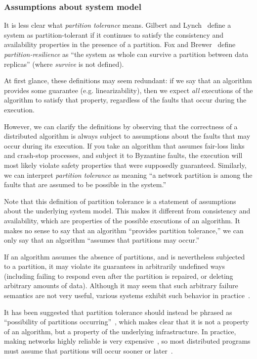 \documentclass[a4paper,twocolumn,10pt]{article}
\begin{document}
\subsubsection{Assumptions about system model}

It is less clear what \emph{partition tolerance} means. Gilbert and Lynch~\cite{Gilbert2002il}
define a system as partition-tolerant if it continues to satisfy the consistency and availability
properties in the presence of a partition. Fox and Brewer~\cite{Fox1999bs} define
\emph{partition-resilience} as ``the system as whole can survive a partition between data replicas''
(where \emph{survive} is not defined).

At first glance, these definitions may seem redundant: if we say that an algorithm provides some
guarantee (e.g. linearizability), then we expect \emph{all} executions of the algorithm to satisfy
that property, regardless of the faults that occur during the execution.

However, we can clarify the definitions by observing that the correctness of a distributed algorithm
is always subject to assumptions about the faults that may occur during its execution. If you take
an algorithm that assumes fair-loss links and crash-stop processes, and subject it to Byzantine
faults, the execution will most likely violate safety properties that were supposedly guaranteed.
Similarly, we can interpret \emph{partition tolerance} as meaning ``a network partition is among the
faults that are assumed to be possible in the system.''

Note that this definition of partition tolerance is a statement of assumptions about the underlying
system model. This makes it different from consistency and availability, which are properties of the
possible executions of an algorithm. It makes no sense to say that an algorithm ``provides partition
tolerance,'' we can only say that an algorithm ``assumes that partitions may occur.''

If an algorithm assumes the absence of partitions, and is nevertheless subjected to a partition, it
may violate its guarantees in arbitrarily undefined ways (including failing to respond even after
the partition is repaired, or deleting arbitrary amounts of data). Although it may seem that such
arbitrary failure semantics are not very useful, various systems exhibit such behavior in
practice~\cite{Kingsbury2014tk, Kingsbury2015uk}.

It has been suggested that partition tolerance should instead be phrased as ``possibility of
partitions occurring''~\cite{Robinson2010tp}, which makes clear that it is not a property of an
algorithm, but a property of the underlying infrastructure. In practice, making networks highly
reliable is very expensive~\cite{Bailis2014jx}, so most distributed programs must assume that
partitions will occur sooner or later~\cite{Hale2010we}.
\end{document}
